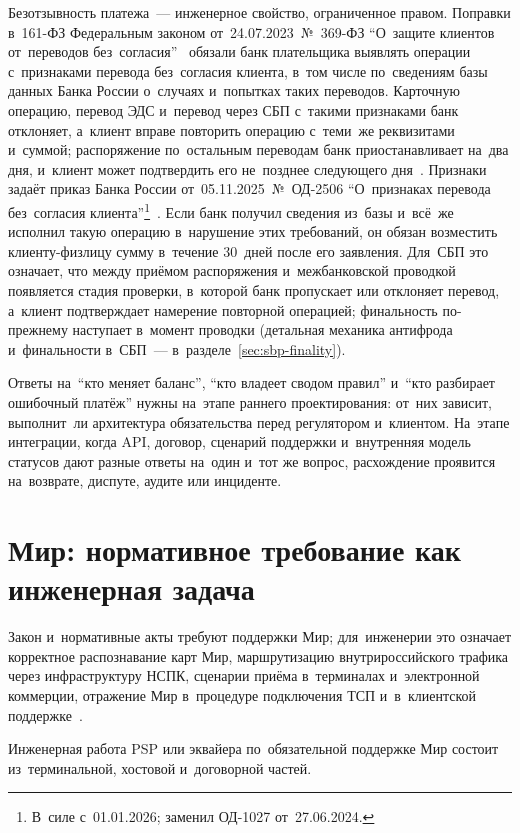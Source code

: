 Безотзывность платежа~--- инженерное свойство, ограниченное правом. Поправки
в~161-ФЗ Федеральным законом от~24.07.2023~№~369-ФЗ \enquote{О~защите клиентов
от~переводов без~согласия}~\cite{fz-369-2023} обязали банк плательщика
выявлять операции с~признаками перевода без~согласия клиента, в~том числе
по~сведениям базы данных Банка России о~случаях и~попытках таких переводов.
Карточную операцию, перевод ЭДС и~перевод через СБП с~такими признаками банк
отклоняет, а~клиент вправе повторить операцию с~теми~же реквизитами
и~суммой; распоряжение по~остальным переводам банк приостанавливает на~два
дня, и~клиент может подтвердить его не~позднее следующего
дня~\cite{fz-161}. Признаки задаёт приказ Банка России
от~05.11.2025~№~ОД-2506 \enquote{О~признаках перевода без~согласия
клиента}\footnote{В~силе с~01.01.2026; заменил ОД-1027
от~27.06.2024.}~\cite{cbr-od-2506}. Если банк получил сведения из~базы
и~всё~же исполнил такую операцию в~нарушение этих требований, он обязан
возместить клиенту-физлицу сумму в~течение 30~дней после его заявления. Для~СБП
это означает, что между приёмом распоряжения и~межбанковской проводкой
появляется стадия проверки, в~которой банк пропускает или отклоняет перевод,
а~клиент подтверждает намерение повторной операцией; финальность по-прежнему
наступает в~момент проводки (детальная механика антифрода и~финальности
в~СБП~--- в~разделе~\ref{sec:sbp-finality}).

Ответы на~\enquote{кто меняет баланс}, \enquote{кто владеет сводом правил}
и~\enquote{кто разбирает ошибочный платёж} нужны на~этапе раннего
проектирования: от~них зависит, выполнит~ли архитектура обязательства перед
регулятором и~клиентом.
На~этапе интеграции, когда API, договор, сценарий поддержки и~внутренняя модель
статусов дают разные ответы на~один и~тот же вопрос, расхождение проявится
на~возврате, диспуте, аудите или инциденте.

\section{Мир: нормативное требование как инженерная
задача}\label{sec:regulation-mir-mandatory}

Закон и~нормативные акты требуют поддержки Мир; для~инженерии это означает
корректное распознавание карт Мир, маршрутизацию внутрироссийского трафика
через инфраструктуру НСПК, сценарии приёма в~терминалах и~электронной
коммерции, отражение Мир в~процедуре подключения ТСП и~в~клиентской
поддержке~\cite{cbr-ps,cbr-nps-faq}.

Инженерная работа PSP или эквайера по~обязательной поддержке Мир состоит
из~терминальной, хостовой и~договорной частей.

